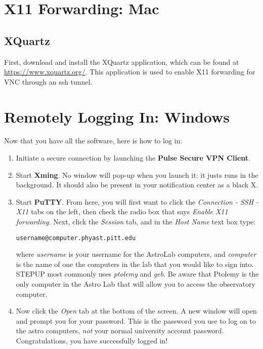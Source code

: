 \documentclass[11pt]{article}
\begin{document}
\section{X11 Forwarding: Mac}
\subsection{XQuartz}
First, download and install the XQuartz application, which can be found at \url{https://www.xquartz.org/}. This application is used to enable X11 forwarding for VNC through an ssh tunnel.


\section{Remotely Logging In: Windows}
Now that you have all the software, here is how to log in:
\begin{enumerate}
\item Initiate a secure connection by launching the \textbf{Pulse Secure VPN Client}.

\item Start \textbf{Xming}. No window will pop-up when you launch it; it justs runs in the background. It should also be present in your notification center as a black X.
\item Start \textbf{PuTTY}. From here, you will first want to click the \emph{Connection - SSH - X11} tabs on the left, then check the radio box that says \emph{Enable X11 forwarding}. Next, click the \emph{Session} tab, and in the \emph{Host Name} text box type:

\begin{verbatim}
username@computer.phyast.pitt.edu
\end{verbatim}

where \emph{username} is your username for the AstroLab computers, and \emph{computer} is the name of one the computers in the lab that you would like to sign into. STEPUP most commonly uses \emph{ptolemy} and \emph{geb}. Be aware that Ptolemy is the only computer in the Astro Lab that will allow you to access the observatory computer. 
\item Now click the \emph{Open} tab at the bottom of the screen. A new window will open and prompt you for your password. This is the password you use to log on to the astro computers, \emph{not} your normal university account password. Congratulations, you have successfully logged in!
\end{enumerate}
\end{document}
